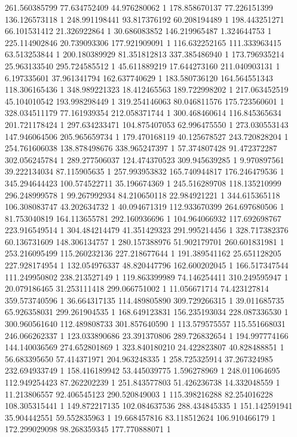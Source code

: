 261.560385799	77.634752409	44.976280062	1
178.858670137	77.226151399	136.126573118	1
248.991198441	93.817376192	60.208194489	1
198.443251271	66.101531412	21.326922864	1
30.686083852	146.219965487	1.324644753	1
225.114902846	20.739093306	177.921909091	1
116.632252165	111.333963415	63.513253844	1
200.180389929	81.351812813	337.385486940	1
173.796935214	25.963133540	295.724585512	1
45.611889219	17.644273160	211.040903131	1
6.197335601	37.961341794	162.637740629	1
183.580736120	164.564551343	118.306165436	1
348.989221323	18.412465563	189.722998202	1
217.063452519	45.104010542	193.998298449	1
319.254146063	80.046811576	175.723560601	1
328.034511179	77.161939354	212.058371744	1
300.468460614	116.845365634	201.721178424	1
297.634233471	104.875407053	62.996475550	1
273.030553143	147.946064506	205.965659734	1
179.470168119	40.125678527	243.720828204	1
254.761606038	138.878498676	338.965247397	1
57.374807428	91.472372287	302.056245784	1
289.277506037	124.474370523	309.945639285	1
9.970897561	39.222134034	87.115905635	1
257.993953832	165.740944817	176.246479536	1
345.294644423	100.574522711	35.196674369	1
245.516289708	118.135210999	296.248999578	1
99.267992934	84.210650118	22.984921221	1
344.615365118	106.308083747	43.202634732	1
40.094671319	112.933670399	264.697680506	1
81.753040819	164.113655781	292.160936696	1
104.964066932	117.692698767	223.916549514	1
304.484214479	41.351429323	291.995214456	1
328.717382376	60.136731609	148.306134757	1
280.157388976	51.902179701	260.601831981	1
253.216095499	115.260232136	227.218677644	1
191.389541162	25.651128205	227.928174954	1
132.054976337	48.820447796	162.600202045	1
166.517347544	111.249950802	238.213527149	1
119.863399989	74.146254411	310.249595947	1
20.079186465	31.253111418	299.066751002	1
11.056671714	74.423127814	359.573740596	1
36.664317135	114.489805890	309.729266315	1
39.011685735	65.926358031	299.261904535	1
168.649123831	156.235193034	228.087336530	1
300.960561640	112.489808733	301.857640590	1
113.579575557	115.551668031	246.066262337	1
123.033890686	23.391370806	289.726832654	1
194.997774166	144.140036569	274.652801869	1
323.840180210	24.422823807	40.828488851	1
56.683395650	57.414371971	204.963248335	1
258.725325914	37.267324985	232.694933749	1
158.416189942	53.445039775	1.596278969	1
248.011064695	112.949254423	87.262202239	1
251.843577803	51.426236738	14.332048559	1
11.213806557	92.406545123	290.520849003	1
115.398216288	82.254016228	108.305315441	1
149.872217135	102.084637536	288.434845335	1
151.142591941	35.904442551	59.552835963	1
19.668457816	83.118512624	106.910466179	1
172.299029098	98.268359345	177.770888071	1
